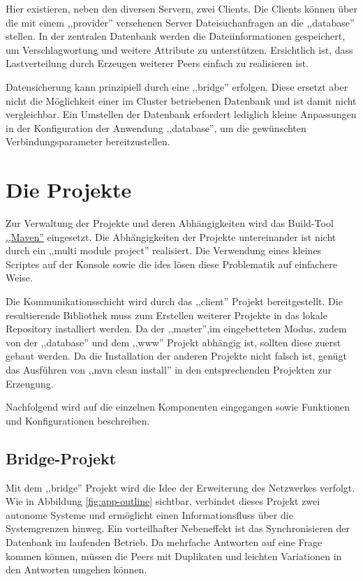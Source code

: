 \documentclass[oneside, ngerman, toc=bibliography,bibliography=totoc,listof=entryprefix, open=right,numbers=noenddot,fontsize=12pt]{scrbook}
\begin{document}
 

Hier existieren, neben den diversen Servern, zwei Clients. Die Clients können über die mit einem ,,provider'' versehenen Server Dateisuchanfragen an die ,,database'' stellen.
In der zentralen Datenbank werden die Dateiinformationen gespeichert, um Verschlagwortung und weitere Attribute zu unterstützen.
Ersichtlich ist, dass Lastverteilung durch Erzeugen weiterer Peers einfach zu realisieren ist. 

Datensicherung kann prinzipiell durch eine ,,bridge'' erfolgen. Diese ersetzt aber nicht die Möglichkeit einer im Cluster betriebenen Datenbank und ist damit nicht vergleichbar. Ein Umstellen der Datenbank erfordert lediglich kleine  Anpassungen  in der Konfiguration  der Anwendung ,,database'', um die gewünschten Verbindungsparameter bereitzustellen.


\section{Die Projekte}
Zur Verwaltung der Projekte und deren Abhängigkeiten wird das Build-Tool \href{https://maven.apache.org/}{,,Maven''} eingesetzt.
Die Abhängigkeiten der Projekte untereinander ist nicht durch ein  ,,multi module project'' realisiert. Die Verwendung eines  kleines Scriptes auf der Konsole sowie die \acrshort{ide}s lösen diese Problematik auf einfachere Weise. 

Die Kommunikationsschicht wird durch das ,,client'' Projekt bereitgestellt.
Die resultierende Bibliothek muss zum Erstellen weiterer Projekte in das lokale Repository installiert werden.
Da der ,,master'',im eingebetteten Modus, zudem von der ,,database'' und dem ,,www'' Projekt abhängig ist, sollten diese zuerst gebaut werden.
Da die Installation der anderen Projekte nicht falsch ist, genügt das Ausführen von ,,mvn clean install'' in den entsprechenden Projekten zur Erzeugung.

Nachfolgend wird auf die einzelnen Komponenten eingegangen sowie Funktionen und Konfigurationen beschreiben.


\subsection{Bridge-Projekt}
Mit dem ,,bridge'' Projekt wird die Idee der Erweiterung des Netzwerkes verfolgt. Wie in Abbildung \ref{fig:app-outline} sichtbar, verbindet dieses Projekt zwei autonome Systeme und ermöglicht einen Informationsfluss über die Systemgrenzen hinweg. Ein vorteilhafter Nebeneffekt ist das Synchronisieren der Datenbank im laufenden Betrieb. Da mehrfache Antworten auf eine Frage kommen können, müssen die Peers mit Duplikaten und leichten Variationen in den Antworten umgehen können.
\end{document}
